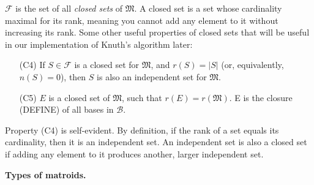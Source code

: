 $\mathcal{F}$ is the set of all \textit{closed sets} of $\mathfrak{M}$. A closed set is a set whose cardinality maximal for its rank, meaning you cannot add any element to it without increasing its rank. Some other useful properties of closed sets that will be useful in our implementation of Knuth's algorithm later:

\begin{itemize}
  \item [(C4)] If $S \in \mathcal{F}$ is a closed set for $\mathfrak{M}$, and $r(S) = |S|$ (or, equivalently, $n(S) = 0$), then $S$ is also an independent set for $\mathfrak{M}$.
  \item [(C5)] $E$ is a closed set of $\mathfrak{M}$, such that $r(E) = r(\mathfrak{M})$. E is the closure (DEFINE) of all bases in $\mathcal{B}$.
\end{itemize}

Property (C4) is self-evident. By definition, if the rank of a set equals its cardinality, then it is an independent set. An independent set is also a closed set if adding any element to it produces another, larger independent set.

\textbf{Types of matroids.} \skelpar